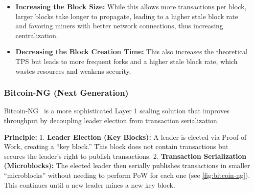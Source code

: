 \begin{itemize}
\item
  \textbf{Increasing the Block Size:} While this allows more
  transactions per block, larger blocks take longer to propagate,
  leading to a higher stale block rate and favoring miners with better
  network connections, thus increasing centralization.

\item
  \textbf{Decreasing the Block Creation Time:} This also increases the
  theoretical TPS but leads to more frequent forks and a higher stale
  block rate, which wastes resources and weakens security.

\end{itemize}



\subsubsection{Bitcoin-NG (Next
Generation)}\label{bitcoin-ng-next-generation}

Bitcoin-NG~\cite{eyal2016bitcoinNG} is a more sophisticated Layer 1 scaling solution that
improves throughput by decoupling leader election from transaction
serialization.

\textbf{Principle:} 1. \textbf{Leader Election (Key Blocks):} A leader
is elected via Proof-of-Work, creating a ``key block.'' This block does
not contain transactions but secures the leader's right to publish
transactions. 2. \textbf{Transaction Serialization (Microblocks):} The
elected leader then serially publishes transactions in smaller
``microblocks'' without needing to perform PoW for each one (see \autoref{fig:bitcoin-ng}). This
continues until a new leader mines a new key block.

